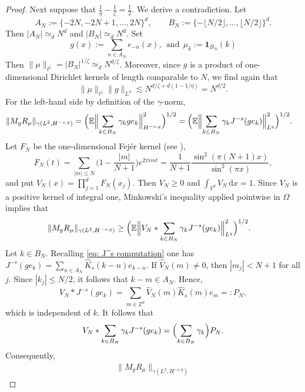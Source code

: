 \documentclass[reqno]{amsart}
\theoremstyle{plain}
\theoremstyle{remark}
\theoremstyle{plain}
\numberwithin{equation}{section}
\newcommand{\di}{\mathrm{d}}
\newcommand{\1}{\one}
\begin{document}
\begin{proof}
Next suppose that $\frac1\eta-\frac1\zeta = \frac12$. We derive a contradiction.
Let 
\[
        A_N:=\{-2N,-2N+1,\ldots,2N\}^d,
        \qquad
        B_N:=\{-\lfloor N/2\rfloor,\ldots,\lfloor N/2\rfloor\}^d .
\]
Then $|A_N|\simeq_d N^d$ and $|B_N|\simeq_d N^d$. Set
\[
        g(x):=\sum_{n\in A_N}e_{-n}(x), \ \ \text{and} \  \ \mu_k:=\mathbf 1_{B_N}(k)
\]
Then $\|\mu\|_{\ell^\zeta}=|B_N|^{1/\zeta}\simeq_d N^{d/\zeta}$.
Moreover, since $g$ is a product of one-dimensional Dirichlet kernels of length
comparable to $N$, we find again that
\[
        \|\mu\|_{\ell^\zeta}\|g\|_{L^\eta}
        \lesssim
        N^{d/\zeta+d(1-1/\eta)} = N^{d/2}.
\]
For the left-hand side by definition of the
$\gamma$-norm,
\[
\begin{aligned}
        \|M_{g}R_{\mu}\|_{\gamma(L^2,H^{-s,q})}
        &=
        \Bigl(
        \mathbb E
        \Bigl\|
            \sum_{k\in B_N}\gamma_k ge_k
        \Bigr\|_{H^{-s,q}}^2
        \Bigr)^{1/2}                                                        
        =
        \Bigl(
        \mathbb E
        \Bigl\|
            \sum_{k\in B_N}\gamma_k J^{-s}(ge_k)
        \Bigr\|_{L^q}^2
        \Bigr)^{1/2}.
\end{aligned}
\]
Let $F_N$ be the one-dimensional Fej\'er kernel (see \cite[Sec. 3.1.3]{Grafakos1}),
\[F_N(t)=\sum_{|m|\leq N}\Big(1-\frac{|m|}{N+1}\Big)e^{2\pi i mt} = \frac{1}{N+1} \frac{\sin^2(\pi(N+1)x)}{\sin^2(\pi x)},\] 
and put
$V_N(x)=\prod_{j=1}^dF_N(x_j)$. Then $V_N\geq0$ and
$\int_{\mathbb T^d}V_N\,\di x=1$. Since $V_N$ is a positive
kernel of integral one, Minkowski's inequality applied pointwise in $\Omega$ implies that
\[
\begin{aligned}
        \|M_{g}R_{\mu}\|_{\gamma(L^2,H^{-s,q})}
        &\geq
        \Bigl(
        \mathbb E
        \Bigl\|
            V_N*\sum_{k\in B_N}\gamma_k J^{-s}(ge_k)
        \Bigr\|_{L^q}^2
        \Bigr)^{1/2}.
\end{aligned}
\]
Let $k\in B_N$. Recalling \eqref{eq: J^s computation} one has
$J^{-s}(ge_k)=\sum_{n\in A_N} \widehat K_s(k-n) e_{k-n}$.
If $\widehat{V}_N(m)\neq0$, then $|m_j|<N+1$ for all $j$. Since $|k_j|\leq N/2$, it follows that $k-m\in A_N$. Hence, 
\[
        V_N*J^{-s}(ge_k)
        =
        \sum_{m\in\mathbb Z^d}\widehat{V}_N(m)\widehat{K}_s(m)  e_m=:P_N,
\]
which is independent of $k$. 
It follows that
\[
        V_N*\sum_{k\in B_N}\gamma_k J^{-s} (ge_k)
        =
        \Bigl(\sum_{k\in B_N}\gamma_k\Bigr)P_N .
\]
Consequently,
\[
\begin{aligned}
        \|M_{g}R_{\mu}\|_{\gamma(L^2,H^{-s,q})}

\end{aligned}\]
\end{proof}
\end{document}
